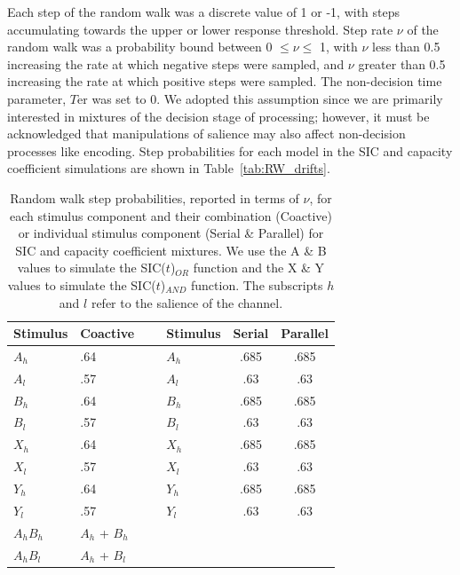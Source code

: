 Each step of the random walk was a discrete value of 1 or -1, with steps accumulating towards the upper or lower response threshold. Step rate $\nu$ of the random walk was a probability bound between 0 $\leq \nu \leq$ 1, with $\nu$ less than 0.5 increasing the rate at which negative steps were sampled, and $\nu$ greater than 0.5 increasing the rate at which positive steps were sampled. The non-decision time parameter, $T$er was set to 0. We adopted this assumption since we are primarily interested in mixtures of the decision stage of processing; however, it must be acknowledged that manipulations of salience may also affect non-decision processes like encoding. Step probabilities for each model in the SIC and capacity coefficient simulations are shown in Table~\ref{tab:RW_drifts}. 

\begin{table}[tbh]
\centering
\caption{Random walk step probabilities, reported in terms of $\nu$, for each stimulus component and their combination (Coactive) or individual stimulus component (Serial \& Parallel) for SIC and capacity coefficient mixtures. We use the A \& B values to simulate the SIC($t$)$_{OR}$ function and the X \& Y values to simulate the SIC($t$)$_{AND}$ function. The subscripts $h$ and $l$ refer to the salience of the channel.}
\begin{tabular}{l l c l c c } 
\hline
Stimulus & Coactive   	   & ~ & Stimulus   &  Serial 	  & Parallel 	\\
\hline
$A_h$ &     .64            & ~ & $A_h$      & .685        & .685        \\
$A_l$ &     .57            & ~ & $A_l$      & .63         & .63         \\
$B_h$ &     .64            & ~ & $B_h$      & .685        & .685        \\
$B_l$ &     .57            & ~ & $B_l$      & .63         & .63         \\
$X_h$ &     .64            & ~ & $X_h$      & .685        & .685        \\
$X_l$ &     .57            & ~ & $X_l$      & .63         & .63         \\
$Y_h$ &     .64            & ~ & $Y_h$      & .685        & .685        \\
$Y_l$ &     .57            & ~ & $Y_l$      & .63         & .63         \\
$A_hB_h$ &  $A_h$ + $B_h$  & ~ &   ~        & ~           & ~           \\
$A_hB_l$ &  $A_h$ + $B_l$  & ~ &   ~        & ~           & ~           \\

\end{tabular}
\end{table}
